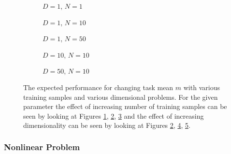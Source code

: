\begin{figure}[!h]
  \centering
    \begin{subfigure}{0.3\textwidth}
      \centering
      \caption{$D=1$, $N=1$}
      \label{fig:linear-m-N-1-D-1}
    \end{subfigure}
    \begin{subfigure}{0.3\textwidth}
      \centering
      \caption{$D=1$, $N=10$}
      \label{fig:linear-m-N-10-D-1}
    \end{subfigure}
    \begin{subfigure}{0.3\textwidth}
      \centering
      \caption{$D=1$, $N=50$}
      \label{fig:linear-m-N-50-D-1}
    \end{subfigure}

    \begin{subfigure}{0.3\textwidth}
      \centering
      \caption{$D=10$, $N=10$}
      \label{fig:linear-m-N-10-D-10}
    \end{subfigure}
    \begin{subfigure}{0.3\textwidth}
      \centering
      \caption{$D=50$, $N=10$}
      \label{fig:linear-m-N-10-D-50}
    \end{subfigure}  

  \caption{The expected performance for changing task mean $m$ with various training samples and various dimensional problems. For the given parameter the effect of increasing number of training samples can be seen by looking at Figures \ref{fig:linear-m-N-1-D-1}, \ref{fig:linear-m-N-10-D-1}, \ref{fig:linear-m-N-50-D-1} and the effect of increasing dimensionality can be seen by looking at Figures \ref{fig:linear-m-N-10-D-1}, \ref{fig:linear-m-N-10-D-10}, \ref{fig:linear-m-N-10-D-50}.}\label{fig:linear-m}
\end{figure}

\subsubsection{Nonlinear Problem}

